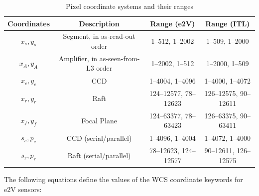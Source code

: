 \documentclass{article}[12pt]
\begin{document}
{\begin{table}
\begin{centering}
\begin{tabular}{| c | c | c | c |}
\hline
{\bf Coordinates} & {\bf Description} & {\bf Range (e2V)} & {\bf Range (ITL)}  \\
\hline
$x_s, y_s$ & Segment, in as-read-out order & 1--512, 1--2002 & 1--509, 1--2000  \\
$x_A, y_A$ & Amplifier, in as-seen-from-L3 order & 1--2002, 1--512  & 1--2000, 1--509 \\
$x_c, y_c$ & CCD & 1--4004, 1--4096 & 1--4000, 1--4072  \\
$x_r, y_r$ & Raft & 124--12577, 78--12623  & 126--12575, 90--12611 \\
$x_f, y_f$ & Focal Plane & 124--63377, 78--63423 & 126--63375, 90--63411 \\
$s_c, p_c$ & CCD (serial/parallel) & 1--4096, 1--4004 & 1--4072, 1--4000 \\
$s_r, p_r$ & Raft (serial/parallel) & 78--12623, 124--12577 & 90--12611, 126--12575 \\
\hline
\end{tabular}
\caption{Pixel coordinate systems and their ranges \label{tab:coords}}
\end{centering}
\end{table}


The following equations define the values of the WCS coordinate keywords for e2V sensors:

}
\end{document}
